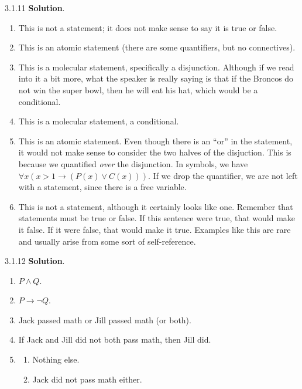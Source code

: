 \documentclass[11pt,]{book}
\theoremstyle{ptxplainnotitle}
\theoremstyle{ptxplaintitle}
\theoremstyle{ptxdefinitionnotitle}
\theoremstyle{ptxdefinitiontitle}
\theoremstyle{ptxdefinitionnotitle}
\theoremstyle{ptxdefinitiontitle}
\theoremstyle{ptxdefinitionnotitle}
\theoremstyle{ptxdefinitiontitle}
\theoremstyle{ptxdefinitiontitlenonumber}
\theoremstyle{ptxdefinitiontitlenonumber}
\numberwithin{equation}{chapter}
\newcommand{\imp}{\rightarrow}
\begin{document}
\begin{divisionexercise}{3.1.11}
\textbf{Solution}.\quad%
\hypertarget{p-2156}{}%
\leavevmode%
\begin{enumerate}[label=(\alph*)]
\item\hypertarget{li-1094}{}This is not a statement; it does not make sense to say it is true or false.%
\item\hypertarget{li-1095}{}This is an atomic statement (there are some quantifiers, but no connectives).%
\item\hypertarget{li-1096}{}This is a molecular statement, specifically a disjunction.  Although if we read into it a bit more, what the speaker is really saying is that if the Broncos do not win the super bowl, then he will eat his hat, which would be a conditional.%
\item\hypertarget{li-1097}{}This is a molecular statement, a conditional.%
\item\hypertarget{li-1098}{}This is an atomic statement.  Even though there is an ``or'' in the statement, it would not make sense to consider the two halves of the disjuction.  This is because we quantified \emph{over} the disjunction.  In symbols, we have \(\forall x (x > 1 \imp (P(x) \vee C(x)))\).  If we drop the quantifier, we are not left with a statement, since there is a free variable.%
\item\hypertarget{li-1099}{}This is not a statement, although it certainly looks like one.  Remember that statements must be true or false.  If this sentence were true, that would make it false.  If it were false, that would make it true.  Examples like this are rare and usually arise from some sort of self-reference.%
\end{enumerate}
%
\end{divisionexercise}%
\begin{divisionexercise}{3.1.12}
\textbf{Solution}.\quad%
\hypertarget{p-2163}{}%
\leavevmode%
\begin{enumerate}[label=(\alph*)]
\item\hypertarget{li-1107}{}\(P \wedge Q\).%
\item\hypertarget{li-1108}{}\(P \imp \neg Q\).%
\item\hypertarget{li-1109}{}\hypertarget{p-2164}{}%
Jack passed math or Jill passed math (or both).%
\item\hypertarget{li-1110}{}\hypertarget{p-2165}{}%
If Jack and Jill did not both pass math, then Jill did.%
\item\hypertarget{li-1111}{}\hypertarget{p-2166}{}%
%
\begin{enumerate}[label=\roman*.]
\item\hypertarget{li-1112}{}Nothing else.%
\item\hypertarget{li-1113}{}Jack did not pass math either.%
\end{enumerate}
%
\end{enumerate}
%
\end{divisionexercise}%
\end{document}
